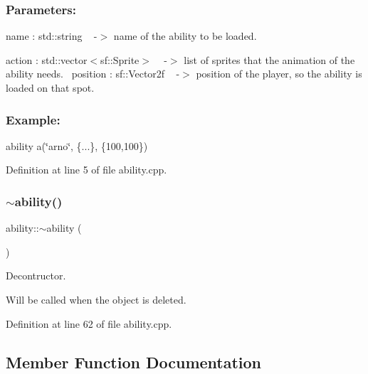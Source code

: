 \subsubsection*{Parameters\+: }

name \+: std\+::string ~\newline
-\/$>$ name of the ability to be loaded.

action \+: std\+::vector$<$sf\+::\+Sprite$>$ ~\newline
-\/$>$ list of sprites that the animation of the ability needs.~\newline
 position \+: sf\+::\+Vector2f ~\newline
-\/$>$ position of the player, so the ability is loaded on that spot.

\subsubsection*{Example\+: }

ability a(\char`\"{}arno\char`\"{}, \{...\}, \{100,100\})~\newline


Definition at line 5 of file ability.\+cpp.

\mbox{\label{classability_a6eedfacfa97cb7195dee8e9c0cccb54d}} 
\subsubsection{\texorpdfstring{$\sim$ability()}{~ability()}}
{\footnotesize\ttfamily ability\+::$\sim$ability (\begin{DoxyParamCaption}{ }\end{DoxyParamCaption})}



Decontructor. 

Will be called when the object is deleted. ~\newline


Definition at line 62 of file ability.\+cpp.



\subsection{Member Function Documentation}
\mbox{\label{classability_a3c6429af67529f039161a35f70caca6f}} 
